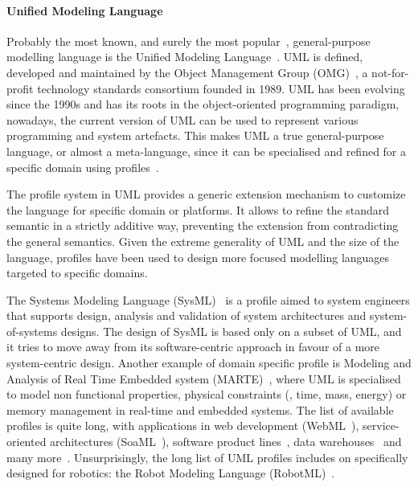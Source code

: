 \paragraph{Unified Modeling Language} Probably the most known, and surely the most popular~\cite{malavolta2012industry}, general-purpose modelling language is the Unified Modeling Language~\cite{rumbaugh2004unified}. UML is defined, developed and maintained by the Object Management Group (OMG)~\cite{omg}, a not-for-profit technology standards consortium founded in 1989. UML has been evolving since the 1990s and has its roots in the object-oriented programming paradigm, nowadays, the current version of UML can be used to represent various programming and system artefacts. This makes UML a true general-purpose language, or almost a meta-language, since it can be specialised and refined for a specific domain using profiles~\cite{fuentes2004introduction}. 

The profile system in UML provides a generic extension mechanism to customize the language for specific domain or platforms. It allows to refine the standard semantic in a strictly additive way, preventing the extension from contradicting the general semantics. Given the extreme generality of UML and the size of the language, profiles have been used to design more focused modelling languages targeted to specific domains.

The Systems Modeling Language (SysML)~\cite{friedenthal2014practical} is a profile aimed to system engineers that supports design, analysis and validation of system architectures and system-of-systems designs. The design of SysML is based only on a subset of UML, and it tries to move away from its software-centric approach in favour of a more system-centric design. Another example of domain specific profile is Modeling and Analysis of Real Time Embedded system (MARTE)~\cite{faugere2007marte}, where UML is specialised to model non functional properties, physical constraints (\eg, time, mass, energy) or memory management in real-time and embedded systems. The list of available profiles is quite long, with applications in web development (WebML~\cite{ceri2000web}), service-oriented architectures (SoaML~\cite{elvesaeter2011model}), software product lines~\cite{ziadi2003towards}, data warehouses~\cite{lujan2006uml} and many more~\cite{fontoura2000uml, aldawud2001uml}. Unsurprisingly, the long list of UML profiles includes on specifically designed for robotics: the Robot Modeling Language (RobotML)~\cite{dhouib2012robotml}.

